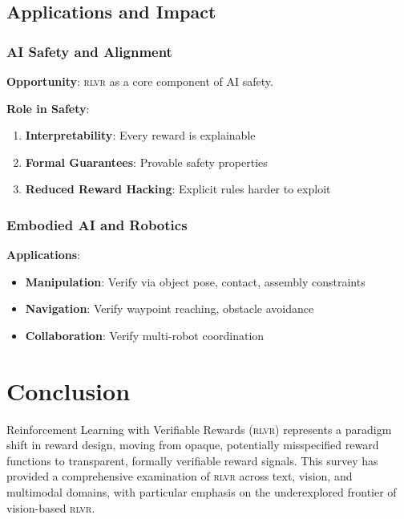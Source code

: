 \documentclass[11pt,a4paper]{article}
\newcommand{\rlvr}{\textsc{rlvr}}
\begin{document}
\subsection{Applications and Impact}
\label{sec:applications}

\subsubsection{AI Safety and Alignment}

\textbf{Opportunity}: \rlvr{} as a core component of AI safety.

\textbf{Role in Safety}:
\begin{enumerate}[leftmargin=*]
    \item \textbf{Interpretability}: Every reward is explainable
    \item \textbf{Formal Guarantees}: Provable safety properties
    \item \textbf{Reduced Reward Hacking}: Explicit rules harder to exploit
\end{enumerate}

\subsubsection{Embodied AI and Robotics}

\textbf{Applications}:
\begin{itemize}[leftmargin=*]
    \item \textbf{Manipulation}: Verify via object pose, contact, assembly constraints
    \item \textbf{Navigation}: Verify waypoint reaching, obstacle avoidance
    \item \textbf{Collaboration}: Verify multi-robot coordination
\end{itemize}

\section{Conclusion}
\label{sec:conclusion}

Reinforcement Learning with Verifiable Rewards (\rlvr{}) represents a paradigm shift in reward design, moving from opaque, potentially misspecified reward functions to transparent, formally verifiable reward signals. This survey has provided a comprehensive examination of \rlvr{} across text, vision, and multimodal domains, with particular emphasis on the underexplored frontier of vision-based \rlvr{}.
\end{document}
